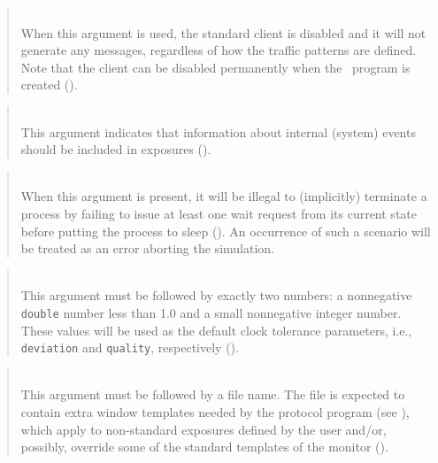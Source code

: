 \begin{quote}
\noindent{}\\ \hspace{0in}
When this argument is used, the standard client is disabled and it will
not generate any messages, regardless of how the traffic patterns are defined.
Note that the client can be disabled permanently when the \smurph\ program is
created ().
\end{quote}

\begin{quote}
\noindent{}\\ \hspace{0in}
This argument indicates that information about internal (system) events
should be included in exposures ().
\end{quote}

\begin{quote}
\noindent{}\\ \hspace{0in}
When this argument is present,
it will be illegal to (implicitly) terminate a process by
failing to issue at least one wait request from its current state before
putting the process to sleep ().
An occurrence of such a scenario will be treated as an error aborting the
simulation.
\end{quote}

\begin{quote}
\noindent{}\\ \hspace{0in}
This argument must be followed by exactly two numbers: a nonnegative
{\tt double} number less than 1.0 and a small nonnegative integer
number.
These values will be used as the default clock tolerance parameters, i.e.,
{\tt deviation} and {\tt quality}, respectively ().
\end{quote}

\begin{quote}
\noindent{}\\ \hspace{0in}
This argument must be followed by a file name.
The file is expected to contain extra window templates needed by the
protocol program (see ),
which apply to non-standard exposures defined by
the user and/or, possibly, override some of the standard templates of
the monitor ().
\end{quote}

